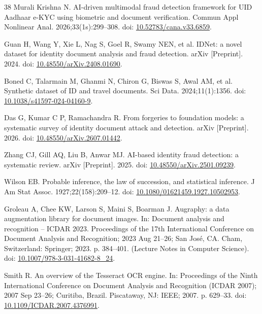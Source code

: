 \documentclass[12pt]{article}
\begin{document}
\begin{thebibliography}{38}
Murali Krishna N. AI-driven multimodal fraud detection framework for UID Aadhaar e-KYC using biometric and document verification. Commun Appl Nonlinear Anal. 2026;33(1s):299--308. doi: \href{https://doi.org/10.52783/cana.v33.6859}{10.52783/cana.v33.6859}.

Guan H, Wang Y, Xie L, Nag S, Goel R, Swamy NEN, et al. IDNet: a novel dataset for identity document analysis and fraud detection. arXiv [Preprint]. 2024. doi: \href{https://doi.org/10.48550/arXiv.2408.01690}{10.48550/arXiv.2408.01690}.

Boned C, Talarmain M, Ghanmi N, Chiron G, Biswas S, Awal AM, et al. Synthetic dataset of ID and travel documents. Sci Data. 2024;11(1):1356. doi: \href{https://doi.org/10.1038/s41597-024-04160-9}{10.1038/s41597-024-04160-9}.

Das G, Kumar C P, Ramachandra R. From forgeries to foundation models: a systematic survey of identity document attack and detection. arXiv [Preprint]. 2026. doi: \href{https://doi.org/10.48550/arXiv.2607.01442}{10.48550/arXiv.2607.01442}.

Zhang CJ, Gill AQ, Liu B, Anwar MJ. AI-based identity fraud detection: a systematic review. arXiv [Preprint]. 2025. doi: \href{https://doi.org/10.48550/arXiv.2501.09239}{10.48550/arXiv.2501.09239}.

Wilson EB. Probable inference, the law of succession, and statistical inference. J Am Stat Assoc. 1927;22(158):209--12. doi: \href{https://doi.org/10.1080/01621459.1927.10502953}{10.1080/01621459.1927.10502953}.

Groleau A, Chee KW, Larson S, Maini S, Boarman J. Augraphy: a data augmentation library for document images. In: Document analysis and recognition -- ICDAR 2023. Proceedings of the 17th International Conference on Document Analysis and Recognition; 2023 Aug 21--26; San Jos\'e, CA. Cham, Switzerland: Springer; 2023. p. 384--401. (Lecture Notes in Computer Science). doi: \href{https://doi.org/10.1007/978-3-031-41682-8_24}{10.1007/978-3-031-41682-8\_24}.

Smith R. An overview of the Tesseract OCR engine. In: Proceedings of the Ninth International Conference on Document Analysis and Recognition (ICDAR 2007); 2007 Sep 23--26; Curitiba, Brazil. Piscataway, NJ: IEEE; 2007. p. 629--33. doi: \href{https://doi.org/10.1109/ICDAR.2007.4376991}{10.1109/ICDAR.2007.4376991}.


\end{thebibliography}
\end{document}
